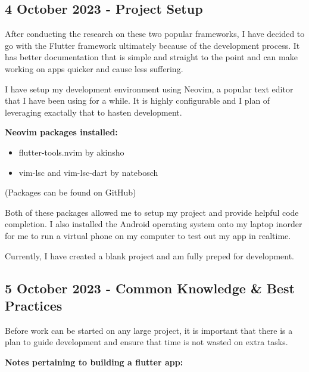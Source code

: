 \documentclass{article}
\begin{document}
\subsection{4 October 2023 - Project Setup}

After conducting the research on these two popular frameworks, I have decided to go with the Flutter framework ultimately because of the development process. It has better documentation that is simple and straight to the point and can make working on apps quicker and cause less suffering.

I have setup my development environment using Neovim, a popular text editor that I have been using for a while. It is highly configurable and I plan of leveraging exactally that to hasten development.

\textbf{Neovim packages installed:}

\begin{itemize}
				\item flutter-tools.nvim by akinsho
				\item vim-lsc and vim-lsc-dart by natebosch
\end{itemize}

(Packages can be found on GitHub)

Both of these packages allowed me to setup my project and provide helpful code completion. I also installed the Android operating system onto my laptop inorder for me to run a virtual phone on my computer to test out my app in realtime.

Currently, I have created a blank project and am fully preped for development.
\newpage


\subsection{5 October 2023 - Common Knowledge \& Best Practices}

Before work can be started on any large project, it is important that there is a plan to guide development and ensure that time is not wasted on extra tasks.

\textbf{Notes pertaining to building a flutter app:}
\end{document}
